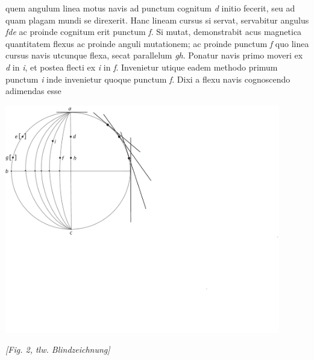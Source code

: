 quem angulum linea motus navis\protect{} ad punctum cognitum \textit{d} initio  fecerit, seu ad quam plagam mundi se direxerit.  Hanc lineam cursus si servat, servabitur angulus \textit{fde} ac proinde cognitum erit punctum \textit{f}. Si  mutat, demonstrabit acus magnetica\protect{}  quantitatem flexus ac proinde anguli mutationem; ac proinde punctum \textit{f} quo linea cursus navis\protect{} utcunque flexa, secat parallelum\protect{} \textit{gh}. Ponatur  navis\protect{} primo moveri  ex \textit{d} in  \textit{i}, et postea  flecti ex \textit{i} in \textit{f}. Invenietur utique eadem methodo primum punctum \textit{i} inde invenietur quoque punctum \textit{f}.   Dixi a flexu navis\protect{} cognoscendo \hfill adimendas esse\pend
  \begin{center}
  \includegraphics[width=0.9\textwidth]{images/38_21v}
 \end{center}\begin{center}
  \textit{[Fig. 2, tlw. Blindzeichnung]}
  \end{center}
